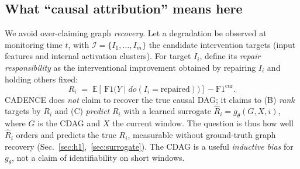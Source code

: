 \documentclass[conference]{IEEEtran}
\begin{document}
\subsection{What ``causal attribution'' means here}
We avoid over-claiming graph \emph{recovery}. Let a degradation be observed
at monitoring time $t$, with $\mathcal{I}=\{I_1,\dots,I_m\}$ the candidate
intervention targets (input features and internal activation clusters).
For target $I_i$, define its \emph{repair responsibility} as the
interventional improvement obtained by repairing $I_i$ and holding others
fixed:
\begin{equation}
R_i \;=\; \mathbb{E}\!\left[\,\mathrm{F1}\big(Y \mid do(I_i{=}\text{repaired})\big)\right] - \mathrm{F1}^{\text{cur}} .
\label{eq:responsibility}
\end{equation}
CADENCE does \emph{not} claim to recover the true causal DAG; it claims to
(B) \emph{rank} targets by $R_i$ and (C) \emph{predict} $R_i$ with a
learned surrogate $\hat R_i = g_\theta(G, X, i)$, where $G$ is the CDAG and
$X$ the current window. The question is thus how well $\hat R_i$ orders
and predicts the true $R_i$, measurable without ground-truth graph
recovery (Sec.~\ref{sec:h1},~\ref{sec:surrogate}). The CDAG is a useful
\emph{inductive bias} for $g_\theta$, not a claim of identifiability on
short windows.
\end{document}
